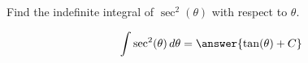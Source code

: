 \documentclass{ximera}
\author{Gregory Hartman \and Matthew Carr}
\begin{document}
\begin{exercise}


Find the indefinite integral of $\sec^2(\theta)$ with respect to $\theta$.

\[
\int \sec^{2}(\theta)\d \theta=\answer{\tan(\theta)+C}
\]


\end{exercise}
\end{document}
